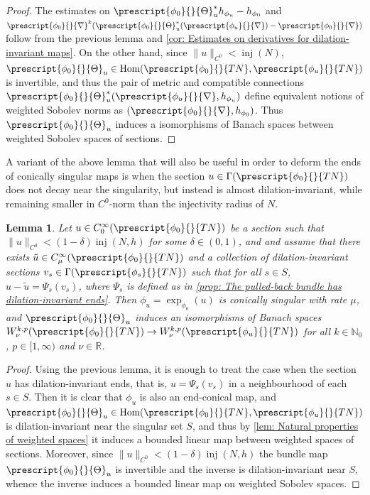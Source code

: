 \documentclass{article}
\numberwithin{equation}{section}        %
\theoremstyle{bfnote}
\newtheorem{lem}[thm]{Lemma}                %
\theoremstyle{definition}
\theoremstyle{bfremark}
\newcommand{\N}{\mathbb{N}}                 %
\newcommand{\R}{\mathbb{R}}                 %
\DeclareMathOperator{\inj}{inj}                 %
\DeclareMathOperator{\Hom}{Hom}                 %
\begin{document}
\begin{proof}
    The estimates on $\prescript{\phi_0}{}{\Theta}_u^*h_{\phi_u}-h_{\phi_0}$ and $\prescript{\phi_0}{}{\nabla}^k(\prescript{\phi_0}{}{\Theta}_u^* (\prescript{\phi_u}{}{\nabla}) - \prescript{\phi_0}{}{\nabla})$ follow from the previous lemma and \cref{cor: Estimates on derivatives for dilation-invariant maps}. On the other hand, since $\|u\|_{C^0} < \inj(N)$, $\prescript{\phi_0}{}{\Theta}_u \in \Hom(\prescript{\phi_0}{}{TN},\prescript{\phi_u}{}{TN})$ is invertible, and thus the pair of metric and compatible connections $\prescript{\phi_0}{}{\Theta}_u^*(\prescript{\phi_u}{}{\nabla},h_{\phi_u})$ define equivalent notions of weighted Sobolev norms as $(\prescript{\phi_0}{}{\nabla},h_{\phi_0})$. Thus $\prescript{\phi_0}{}{\Theta}_u$ induces a isomorphisms of Banach spaces between weighted Sobolev spaces of sections.
\end{proof}

A variant of the above lemma that will also be useful in order to deform the ends of conically singular maps is when the section $u \in \Gamma(\prescript{\phi_0}{}{TN})$ does not decay near the singularity, but instead is almost dilation-invariant, while remaining smaller in $C^0$-norm than the injectivity radius of $N$.

\begin{lem}     \label{lem: theta induces iso of Banach spaces}
    Let $u \in C^\infty_0(\prescript{\phi_0}{}{TN})$ be a section such that $\|u\|_{C^0} < (1-\delta) \inj(N,h)$ for some $\delta \in (0,1)$, and and assume that there exists $\tilde{u} \in C^\infty_\mu(\prescript{\phi_0}{}{TN})$ and a collection of dilation-invariant sections $v_s \in \Gamma(\prescript{\phi_s}{}{TN})$ such that for all $s \in S$, $u - \tilde{u} = \Psi_s(v_s)$, where $\Psi_s$ is defined as in \cref{prop: The pulled-back bundle has dilation-invariant ends}. Then $\phi_u = \exp_{\phi_0}(u)$ is conically singular with rate $\mu$, and $\prescript{\phi_0}{}{\Theta}_u$ induces an isomorphisms of Banach spaces $W^{k,p}_\nu(\prescript{\phi_0}{}{TN}) \to W^{k,p}_\nu(\prescript{\phi_u}{}{TN})$ for all $k \in \N_0$, $p \in [1,\infty)$ and $\nu \in \R$.
\end{lem}

\begin{proof}
    Using the previous lemma, it is enough to treat the case when the section $u$ has dilation-invariant ends, that is, $u = \Psi_s(v_s)$ in a neighbourhood of each $s \in S$. Then it is clear that $\phi_u$ is also an end-conical map, and $\prescript{\phi_0}{}{\Theta}_u \in \Hom(\prescript{\phi_0}{}{TN},\prescript{\phi_u}{}{TN})$ is dilation-invariant near the singular set $S$, and thus by \cref{lem: Natural properties of weighted spaces} it induces a bounded linear map between weighted spaces of sections. Moreover, since $\|u\|_{C^0} < (1-\delta) \inj(N,h)$ the bundle map $\prescript{\phi_0}{}{\Theta}_u$ is invertible and the inverse is dilation-invariant near $S$, whence the inverse induces a bounded linear map on weighted Sobolev spaces.
\end{proof}
\end{document}
